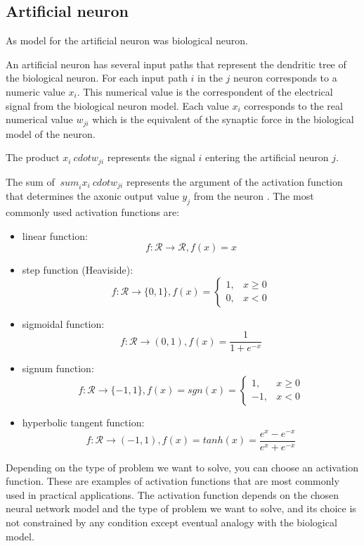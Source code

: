 \subsection{Artificial neuron}

As model for the artificial neuron was biological neuron.

An artificial neuron has several input paths that represent the dendritic tree of the biological neuron. For each input path $ i $ in the $ j $ neuron corresponds to a numeric value $ x_i $. This numerical value is the correspondent of the electrical signal from the biological neuron model. Each value $ x_i $ corresponds to the real numerical value $ w_ {ji} $ which is the equivalent of the synaptic force in the biological model of the neuron.

The product $ x_i \ cdot w_ {ji} $ represents the signal $ i $ entering the artificial neuron $ j $.

The sum of $ \ sum_ {i} ^ {} x_i \ cdot w_ {ji} $ represents the argument of the activation function that determines the axonic output value $ y_j $ from the neuron \cite{calculNeuronal}. The most commonly used activation functions are:

\begin{itemize}
  \item linear function: $$f \colon \mathcal{R} \to \mathcal{R}, f(x)=x$$
  \item step function (Heaviside): $$f \colon \mathcal{R} \to \{0,1\}, 
    f(x)= \begin{cases} 
            1, & x \geq 0 \\ 
            0, & x < 0 
          \end{cases}$$
  \item sigmoidal function: $$f \colon \mathcal{R} \to (0,1), f(x)=\frac{1}{1+e^{-x}}$$
  \item signum function: $$f \colon \mathcal{R} \to \{-1,1\}, f(x)=sgn(x)=
          \begin{cases} 
            1, & x \geq 0 \\ 
            -1, & x < 0 
          \end{cases}$$
  \item hyperbolic tangent function: $$f \colon \mathcal{R} \to (-1,1), f(x)=tanh(x)=\frac{e^x-e^{-x}}{e^x+e^{-x}} $$
\end{itemize}

Depending on the type of problem we want to solve, you can choose an activation function. These are examples of activation functions that are most commonly used in practical applications. The activation function depends on the chosen neural network model and the type of problem we want to solve, and its choice is not constrained by any condition except eventual analogy with the biological model.

